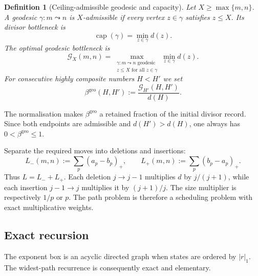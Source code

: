 \documentclass[11pt]{article}
\numberwithin{equation}{section}
\theoremstyle{blueplain}
\theoremstyle{bluedef}
\newtheorem{definition}[theorem]{Definition}
\newcommand{\Gcal}{\mathcal G}
\newcommand{\betageo}{\beta^{\mathrm{geo}}}
\begin{document}
\begin{definition}[Ceiling-admissible geodesic and capacity]
\label{def:capacity}
Let $X\ge\max\{m,n\}$.  A geodesic $\gamma:m\leadsto n$ is \emph{$X$-admissible} if every vertex $z\in\gamma$ satisfies $z\le X$.  Its divisor bottleneck is
\begin{equation}
 \operatorname{cap}(\gamma)=\min_{z\in\gamma}d(z).
 \label{eq:path-capacity}
\end{equation}
The optimal geodesic bottleneck is
\begin{equation}
 \Gcal_X(m,n)=
 \max_{\substack{\gamma:m\leadsto n\text{ geodesic}\\z\le X\text{ for all }z\in\gamma}}
 \min_{z\in\gamma}d(z).
 \label{eq:optimal-capacity}
\end{equation}
For consecutive highly composite numbers $H<H'$ we set
\begin{equation}
 \betageo(H,H'):=\frac{\Gcal_{H'}(H,H')}{d(H)}.
 \label{eq:beta-definition}
\end{equation}
\end{definition}

The normalisation makes $\betageo$ a retained fraction of the initial divisor record.  Since both endpoints are admissible and $d(H')>d(H)$, one always has $0<\betageo\le1$.

Separate the required moves into deletions and insertions:
\begin{equation}
 L_-(m,n):=\sum_p(a_p-b_p)_+,
 \qquad
 L_+(m,n):=\sum_p(b_p-a_p)_+.
 \label{eq:Lpm}
\end{equation}
Thus $L=L_-+L_+$.  Each deletion $j\to j-1$ multiplies $d$ by $j/(j+1)$, while each insertion $j-1\to j$ multiplies it by $(j+1)/j$.  The size multiplier is respectively $1/p$ or $p$.  The path problem is therefore a scheduling problem with exact multiplicative weights.

\subsection{Exact recursion}

The exponent box is an acyclic directed graph when states are ordered by $|r|_1$.  The widest-path recurrence is consequently exact and elementary.
\end{document}
